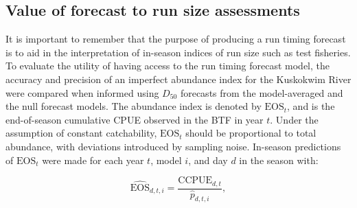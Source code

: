 \documentclass[12pt,]{book}
\theoremstyle{definition}
\theoremstyle{definition}
\theoremstyle{definition}
\theoremstyle{remark}
\begin{document}
\subsection{Value of forecast to run size assessments}\label{eos-preds}

\noindent
It is important to remember that the purpose of producing a run timing
forecast is to aid in the interpretation of in-season indices of run
size such as test fisheries. To evaluate the utility of having access to
the run timing forecast model, the accuracy and precision of an
imperfect abundance index for the Kuskokwim River were compared when
informed using \(D_{50}\) forecasts from the model-averaged and the null
forecast models. The abundance index is denoted by \(\text{EOS}_t\), and
is the end-of-season cumulative CPUE observed in the BTF in year \(t\).
Under the assumption of constant catchability, \(\text{EOS}_t\) should
be proportional to total abundance, with deviations introduced by
sampling noise. In-season predictions of \(\text{EOS}_t\) were made for
each year \(t\), model \(i\), and day \(d\) in the season with:

\begin{equation}
  \widehat{\text{EOS}}_{d,t,i}=\frac{\text{CCPUE}_{d,t}}{\hat{p}_{d,t,i}},
\label{eq:eos}
\end{equation}
\end{document}
